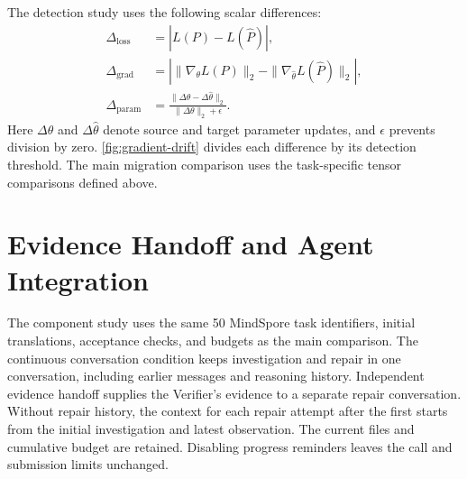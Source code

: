 \documentclass{article}
\begin{document}
The detection study uses the following scalar differences:
\begin{align}
\Delta_{\mathrm{loss}} &= |L(P)-L(\hat P)|, \\
\Delta_{\mathrm{grad}} &= \left|\|\nabla_{\theta}L(P)\|_2-\|\nabla_{\hat\theta}L(\hat P)\|_2\right|, \\
\Delta_{\mathrm{param}} &= \frac{\|\Delta\theta-\Delta\hat\theta\|_2}{\|\Delta\theta\|_2+\epsilon}.
\end{align}
Here $\Delta\theta$ and $\Delta\hat\theta$ denote source and target parameter updates, and $\epsilon$ prevents division by zero. \cref{fig:gradient-drift} divides each difference by its detection threshold. The main migration comparison uses the task-specific tensor comparisons defined above.

\section{Evidence Handoff and Agent Integration}
\label{sec:component-study}
The component study uses the same 50 MindSpore task identifiers, initial translations, acceptance checks, and budgets as the main comparison. The continuous conversation condition keeps investigation and repair in one conversation, including earlier messages and reasoning history. Independent evidence handoff supplies the Verifier's evidence to a separate repair conversation. Without repair history, the context for each repair attempt after the first starts from the initial investigation and latest observation. The current files and cumulative budget are retained. Disabling progress reminders leaves the call and submission limits unchanged.
\end{document}
